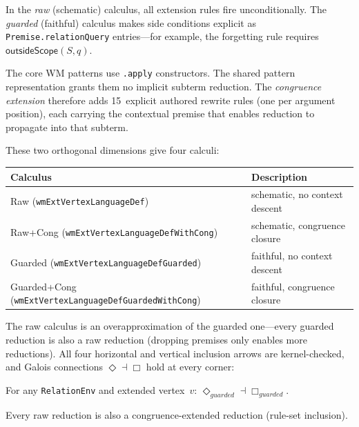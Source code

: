 \documentclass[11pt,openany]{report}
\begin{document}
In the \emph{raw} (schematic) calculus, all extension rules fire
unconditionally.  The \emph{guarded} (faithful) calculus makes side
conditions explicit as \texttt{Premise.relationQuery} entries---for example,
the forgetting rule requires $\mathsf{outsideScope}(S, q)$.

The core WM patterns use \texttt{.apply} constructors.  The shared pattern
representation grants them no implicit subterm reduction.  The
\emph{congruence extension} therefore adds 15~explicit authored rewrite rules
(one per argument position), each carrying the contextual premise that enables
reduction to propagate into that subterm.

These two orthogonal dimensions give four calculi:

\begin{center}
\begin{tabular}{ll}
\toprule
\textbf{Calculus} & \textbf{Description} \\
\midrule
Raw (\texttt{wmExtVertexLanguageDef}) & schematic, no context descent \\
Raw+Cong (\texttt{wmExtVertexLanguageDefWithCong}) & schematic, congruence closure \\
Guarded (\texttt{wmExtVertexLanguageDefGuarded}) & faithful, no context descent \\
Guarded+Cong (\texttt{wmExtVertexLanguageDefGuardedWithCong}) & faithful, congruence closure \\
\bottomrule
\end{tabular}
\end{center}

The raw calculus is an overapproximation of the guarded one---every guarded
reduction is also a raw reduction (dropping premises only enables more
reductions).  All four horizontal and vertical inclusion arrows are
kernel-checked, and Galois connections $\Diamond \dashv \Box$ hold at every
corner:

\begin{theorem}
For any \texttt{RelationEnv} and extended vertex~$v$:
$\Diamond_{\mathit{guarded}} \dashv \Box_{\mathit{guarded}}$.
\end{theorem}

\begin{theorem}
Every raw reduction is also a congruence-extended reduction (rule-set
inclusion).
\end{theorem}
\end{document}
